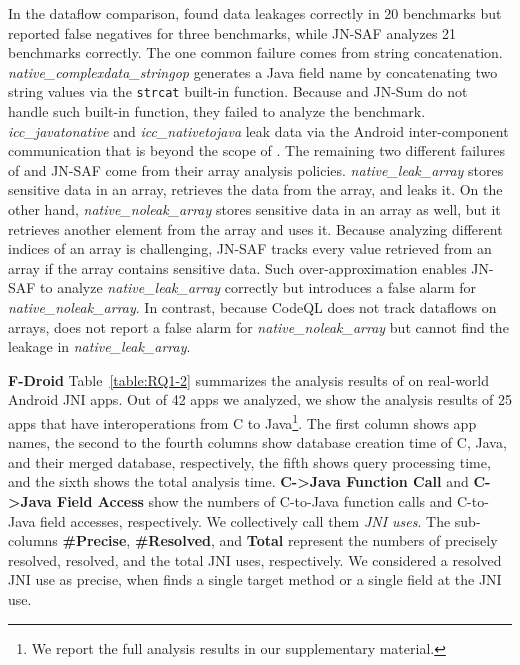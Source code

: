In the dataflow comparison, \ours found data leakages correctly in 20
benchmarks but reported false negatives for three benchmarks, while JN-SAF
analyzes 21 benchmarks correctly. 
The one common failure comes from string concatenation.
{\it native\_complexdata\_stringop} generates
a Java field name by concatenating two string values via the {\tt strcat} built-in function.
Because \ours and JN-Sum do not handle such built-in
function, they failed to analyze the benchmark.
{\it icc\_javatonative} and {\it icc\_nativetojava} leak data via the Android
inter-component communication that is beyond the scope of \ours.
The remaining two different failures of \ours and JN-SAF come from their array analysis policies.
{\it native\_leak\_array} stores sensitive data in an array, retrieves the data from the array,
and leaks it.  On the other hand, {\it native\_noleak\_array} stores sensitive
data in an array as well, but it retrieves another element from the array and uses it.
Because analyzing different indices of an array is challenging, JN-SAF
tracks every value retrieved from an array if the array contains sensitive data.
Such over-approximation enables JN-SAF to analyze {\it
native\_leak\_array} correctly but introduces a false alarm for {\it
native\_noleak\_array}.  In contrast, because CodeQL does not
track dataflows on arrays, \ours does not report
a false alarm for {\it native\_noleak\_array} but cannot find the leakage in {\it
native\_leak\_array}.

\textbf{F-Droid} Table~\ref{table:RQ1-2} summarizes the analysis results of \ours on real-world Android JNI apps.
Out of 42 apps we analyzed, we show the analysis
results of 25 apps that have interoperations from C to Java\footnote{We
report the full analysis results in our supplementary material.}.
The first column shows app names, the second to the fourth columns show database
creation time of C, Java, and their merged database, respectively, the fifth
shows query processing time, and the sixth shows the total analysis time.
{\bf C->Java Function Call} and {\bf C->Java Field Access}
show the numbers of C-to-Java function calls and
C-to-Java field accesses, respectively. We collectively call them
\emph{JNI uses}.
The sub-columns {\bf \#Precise}, {\bf \#Resolved}, and {\bf Total}
represent the numbers of precisely resolved, 
resolved, and the total JNI uses, respectively.
We considered a resolved JNI use as precise, when \ours finds a single target method
or a single field at the JNI use.


